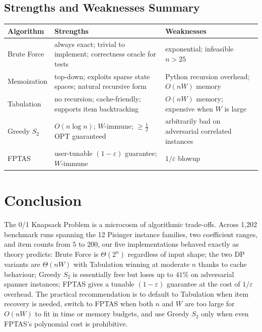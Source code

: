 \documentclass[11pt, a4paper]{article}
\begin{document}
\subsection{Strengths and Weaknesses Summary}
\begin{table}[H]
\centering
\small
\begin{tabular}{@{}p{2.4cm}p{5.6cm}p{5.6cm}@{}}
\toprule
\textbf{Algorithm} & \textbf{Strengths} & \textbf{Weaknesses} \\
\midrule
Brute Force        & always exact; trivial to implement; correctness oracle for tests
                   & exponential; infeasible $n>25$ \\
Memoization        & top-down; exploits sparse state spaces; natural recursive form
                   & Python recursion overhead; $O(nW)$ memory \\
Tabulation         & no recursion; cache-friendly; supports item backtracking
                   & $O(nW)$ memory; expensive when $W$ is large \\
Greedy $S_2$       & $O(n\log n)$; $W$-immune; $\ge\tfrac{1}{2}$OPT guaranteed
                   & arbitrarily bad on adversarial correlated instances \\
FPTAS              & user-tunable $(1{-}\varepsilon)$ guarantee; $W$-immune
                   & $1/\varepsilon$ blowup \\
\bottomrule
\end{tabular}
\end{table}

\section{Conclusion}

The 0/1 Knapsack Problem is a microcosm of algorithmic trade-offs. Across
1{,}202 benchmark runs spanning the 12 Pisinger instance families, two
coefficient ranges, and item counts from $5$ to $200$, our five
implementations behaved exactly as theory predicts: Brute Force is
$\Theta(2^n)$ regardless of input shape; the two DP variants are $\Theta(nW)$
with Tabulation winning at moderate $n$ thanks to cache behaviour; Greedy
$S_2$ is essentially free but loses up to $41\%$ on adversarial spanner
instances; FPTAS gives a tunable $(1-\varepsilon)$ guarantee at the cost of
$1/\varepsilon$ overhead. The practical recommendation is to default to
Tabulation when item recovery is needed, switch to FPTAS when both $n$ and $W$
are too large for $O(nW)$ to fit in time or memory budgets, and use Greedy
$S_2$ only when even FPTAS's polynomial cost is prohibitive.
\end{document}

